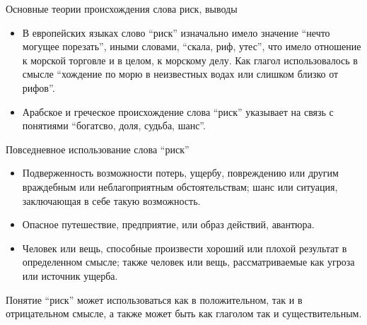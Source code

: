 \documentclass[financial_risks_lectures.tex]{subfiles}
\begin{document}
\begin{frame}{Основные теории происхождения слова риск, выводы}
\begin{itemize}
\item
В европейских языках слово ``риск'' изначально имело значение ``нечто могущее порезать'', иными словами, ``скала, риф, утес'', что имело отношение к морской торговле и в целом, к морскому делу. Как глагол использовалось в смысле ``хождение по морю в неизвестных водах или слишком близко от рифов''.
\item
Арабское и греческое происхождение слова ``риск'' указывает на связь с понятиями ``богатсво, доля, судьба, шанс''.

\end{itemize}
\end{frame}
\begin{frame}[shrink=10]{Повседневное использование слова ``риск''}
\begin{itemize}
\item
Подверженность возможности потерь, ущербу, повреждению или другим враждебным или неблагоприятным обстоятельствам; шанс или ситуация, заключающая в себе такую возможность.
\item
Опасное путешествие, предприятие, или образ действий, авантюра.
\item
Человек или вещь, способные произвести хороший или плохой результат в определенном смысле; также человек или вещь, рассматриваемые как угроза или источник ущерба.
\end{itemize}
Понятие ``риск'' может использоваться как в положительном, так и в отрицательном смысле, а также может быть как глаголом так и существительным.
\end{frame}
\end{document}
